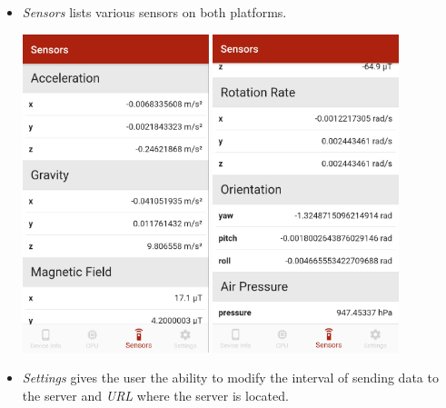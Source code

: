 \documentclass{article}
\begin{document}
\begin{itemize}
    \item \textit{Sensors} lists various sensors on both platforms.

    \begin{center}
      \includegraphics[height=25em]{mobile-sensors}
      \includegraphics[height=25em]{mobile-sensors-2}
    \end{center}

    \item \textit{Settings} gives the user the ability to modify the interval of sending data to the server and \textit{URL} where the server is located.


\end{itemize}
\end{document}
